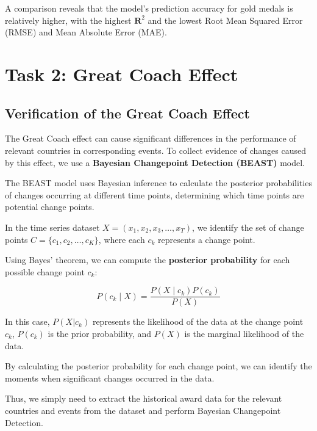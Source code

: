 \documentclass[12pt]{article}  %
\begin{document}
A comparison reveals that the model's prediction accuracy for gold medals is relatively higher, with the highest \(\mathbf{R}^2\) and the lowest Root Mean Squared Error (RMSE) and Mean Absolute Error (MAE).








\section{Task 2: Great Coach Effect}
\subsection{Verification of the Great Coach Effect}
The Great Coach effect can cause significant differences in the performance of relevant countries in corresponding events. To collect evidence of changes caused by this effect, we use a \textbf{Bayesian Changepoint Detection (BEAST)} model.

The BEAST model uses Bayesian inference to calculate the posterior probabilities of changes occurring at different time points, determining which time points are potential change points.

In the time series dataset \(X = (x_1, x_2, x_3, \ldots, x_T)\), we identify the set of change points \(C = \{c_1, c_2, \ldots, c_K\}\), where each \(c_k\) represents a change point.

Using Bayes' theorem\cite{1}, we can compute the \textbf{posterior probability} for each possible change point $c_k$:

\begin{equation}
	P(c_k \mid X) = \frac{P(X \mid c_k) P(c_k)}{P(X)}
\end{equation}

In this case, \( P(X|c_k) \) represents the likelihood of the data at the change point \( c_k \), \( P(c_k) \) is the prior probability, and \( P(X) \) is the marginal likelihood of the data.

By calculating the posterior probability for each change point, we can identify the moments when significant changes occurred in the data.

Thus, we simply need to extract the historical award data for the relevant countries and events from the dataset and perform Bayesian Changepoint Detection.
\end{document}

